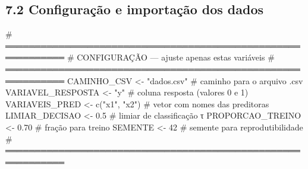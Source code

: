\documentclass[
  letterpaper,
  DIV=11,
  numbers=noendperiod]{scrartcl}
\newenvironment{Shaded}{\begin{snugshade}}{\end{snugshade}}
\newcommand{\CommentTok}[1]{\textcolor[rgb]{0.37,0.37,0.37}{#1}}
\newcommand{\DecValTok}[1]{\textcolor[rgb]{0.68,0.00,0.00}{#1}}
\newcommand{\FloatTok}[1]{\textcolor[rgb]{0.68,0.00,0.00}{#1}}
\newcommand{\FunctionTok}[1]{\textcolor[rgb]{0.28,0.35,0.67}{#1}}
\newcommand{\NormalTok}[1]{\textcolor[rgb]{0.00,0.23,0.31}{#1}}
\newcommand{\OtherTok}[1]{\textcolor[rgb]{0.00,0.23,0.31}{#1}}
\newcommand{\StringTok}[1]{\textcolor[rgb]{0.13,0.47,0.30}{#1}}
\begin{document}
\subsection{7.2 Configuração e importação dos
dados}\label{configurauxe7uxe3o-e-importauxe7uxe3o-dos-dados}

\begin{Shaded}
\begin{Highlighting}[]
\CommentTok{\# ════════════════════════════════════════════════════════════}
\CommentTok{\#  CONFIGURAÇÃO — ajuste apenas estas variáveis}
\CommentTok{\# ════════════════════════════════════════════════════════════}
\NormalTok{CAMINHO\_CSV       }\OtherTok{\textless{}{-}} \StringTok{"dados.csv"}      \CommentTok{\# caminho para o arquivo .csv}
\NormalTok{VARIAVEL\_RESPOSTA }\OtherTok{\textless{}{-}} \StringTok{"y"}              \CommentTok{\# coluna resposta (valores 0 e 1)}
\NormalTok{VARIAVEIS\_PRED    }\OtherTok{\textless{}{-}} \FunctionTok{c}\NormalTok{(}\StringTok{"x1"}\NormalTok{, }\StringTok{"x2"}\NormalTok{)   }\CommentTok{\# vetor com nomes das preditoras}
\NormalTok{LIMIAR\_DECISAO    }\OtherTok{\textless{}{-}} \FloatTok{0.5}             \CommentTok{\# limiar de classificação τ}
\NormalTok{PROPORCAO\_TREINO  }\OtherTok{\textless{}{-}} \FloatTok{0.70}            \CommentTok{\# fração para treino}
\NormalTok{SEMENTE           }\OtherTok{\textless{}{-}} \DecValTok{42}              \CommentTok{\# semente para reprodutibilidade}
\CommentTok{\# ════════════════════════════════════════════════════════════}


\end{Highlighting}
\end{Shaded}
\end{document}
